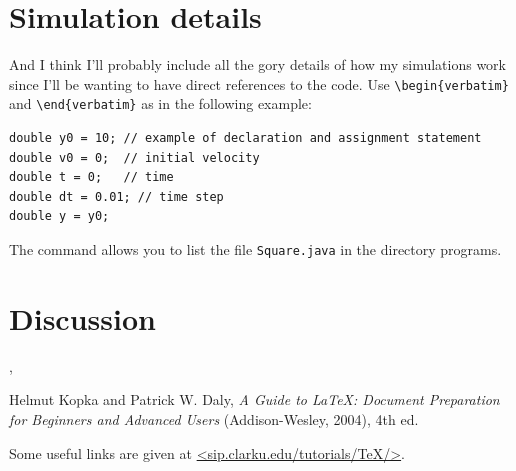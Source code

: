 \documentclass[prb,11pt]{revtex4-1}
\begin{document}
\section{Simulation details}
And I think I'll probably include all the gory details of how my simulations work since I'll be wanting to have direct references to the code. Use \verb+\begin{verbatim}+ and
\verb+\end{verbatim}+ as in the following example:
\begin{verbatim}
double y0 = 10; // example of declaration and assignment statement
double v0 = 0;  // initial velocity
double t = 0;   // time
double dt = 0.01; // time step
double y = y0;
\end{verbatim}
The command \verb++ allows
you to list the file \texttt{Square.java} in the directory
programs.

\section{Discussion}

{\color{blue}{Finally I wax philosophical}},
{\color{green}{but}} {\color{cyan}{who is going pay for the ink?}}

\begin{thebibliography}{5}

Helmut Kopka and Patrick W. Daly, \textsl{A Guide to
\LaTeX: Document Preparation for Beginners and Advanced Users} (Addison-Wesley, 2004), 4th ed.

Some useful links are
given at \url{<sip.clarku.edu/tutorials/TeX/>}.

\end{thebibliography}
\end{document}
